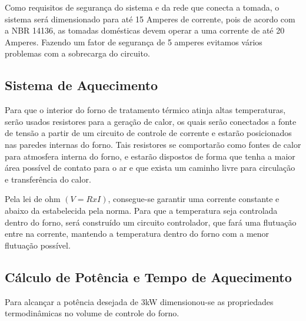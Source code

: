 Como requisitos de segurança do sistema e da rede que conecta a tomada, o sistema será dimensionado para até 15 Amperes de corrente, pois de acordo com a NBR 14136, as tomadas domésticas devem operar a uma corrente de até 20 Amperes. Fazendo um fator de segurança de 5 amperes evitamos vários problemas com a sobrecarga do circuito.

\subsection{Sistema de Aquecimento}

Para que o interior do forno de tratamento térmico atinja altas temperaturas, serão usados resistores para a geração de calor, os quais serão conectados a fonte de tensão a partir de um circuito de controle de corrente e estarão posicionados nas paredes internas do forno. Tais resistores se comportarão como fontes de calor para atmosfera interna do forno, e estarão dispostos de forma que tenha a maior área possível de contato para o ar e que exista um caminho livre para circulação e transferência do calor.

Pela lei de ohm $(V=R x I)$, consegue-se garantir uma corrente constante e abaixo da estabelecida pela norma. Para que a temperatura seja controlada dentro do forno, será construído um circuito controlador, que fará uma flutuação entre na corrente, mantendo a temperatura dentro do forno com a menor flutuação possível.

\subsection{Cálculo de Potência e Tempo de Aquecimento}

Para alcançar a potência desejada de 3kW dimensionou-se as propriedades termodinâmicas no volume de controle do forno.

